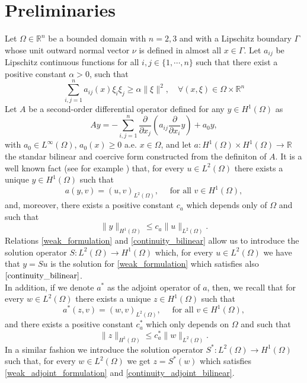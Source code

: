 \documentclass[11pt,a4paper]{amsart}
\renewcommand{\l}{\left}
\renewcommand{\r}{\right}
\newcommand{\om}{\Omega}
\newcommand{\reals}{\mathbb{R}}
\newcommand{\norm}[1]{\lVert #1 \rVert}
\begin{document}
 \section{Preliminaries}
Let $\om \in \reals^{n}$ be a bounded domain with $n=2, 3$ and with a Lipschitz boundary $\Gamma$ whose unit outward normal vector $\nu$ is defined in almost all $x \in \Gamma$. Let  $a_{ij}$ be Lipschitz continuous functions for all $i,j\in \{1,\cdots,n\}$  such that there exist a positive constant $\alpha>0$, such that
\begin{equation}\label{pdecondition}
    \sum_{i,j=1}^{n}a_{ij}(x)\xi_{i}\xi_{j} \ge \alpha\norm{\xi}^2, \quad \forall  (x,\xi)\in \om\times\reals^n
\end{equation}
Let $A$ be a second-order differential operator defined for any $y\in H^1(\om)$ as
\[
    Ay=-\sum_{i,j=1}^{n}\dfrac{\partial}{\partial x_j}\l(a_{ij} \dfrac{\partial}{\partial x_i}y\r)+a_0y,
\]
with $a_0\in L^{\infty}(\om)$, $a_0(x)\ge 0$ a.e. $x\in \om$, and let $a: H^1(\om)\times H^1(\om)\to \reals$ the standar bilinear and coercive form constructed from the definiton of $A$. It is a well known fact (see for example \cite{trol}) that, for every $u\in L^2(\om)$ there exists a unique $y\in H^{1}(\om)$ such that
\begin{equation}\label{weak_formulation}
    a(y,v)=(u,v)_{L^2(\om)},\quad \mbox{ for all }v\in H^1(\om),
\end{equation}
and, moreover, there exists a positive constant $c_{a}$ which depends only of $\om$ and such that
\begin{equation}\label{continuity_bilinear}
    \norm{y}_{H^1(\om)}\le c_{a}\norm{u}_{L^2(\om)}.
\end{equation}
Relations \eqref{weak_formulation} and \eqref{continuity_bilinear} allow us to introduce the solution operator $S:L^2(\om)\to H^1(\om)$ which, for every $u\in L^2(\om)$ we have that $y=Su$ is the solution for \eqref{weak_formulation} which satisfies also $\eqref{continuity_bilinear}$.\\

In addition, if we denote $a^*$ as the adjoint operator of $a$, then, we recall that \cite{trol} for every $w\in L^2(\om)$ there exists a unique $z\in H^1(\om)$ such that
\begin{equation}\label{weak_adjoint_formulation}
a^*(z,v)=(w,v)_{L^2(\om)},\quad \mbox{ for all }v\in H^{1}(\om),
\end{equation}
and there exists a positive constant $c^*_{a}$ which only depends on $\om$ and such that
\begin{equation}\label{continuity_adjoint_bilinear}
\norm{z}_{H^1(\om)}\le c^*_a\norm{w}_{L^2(\om)}.
\end{equation}
In a similar fashion we introduce the solution operator $S^*: L^2(\om)\to H^1(\om)$ such that, for every $w\in L^2(\om)$ we get $z=S^*(w)$ which satisfies \eqref{weak_adjoint_formulation} and \eqref{continuity_adjoint_bilinear}.
\end{document}
